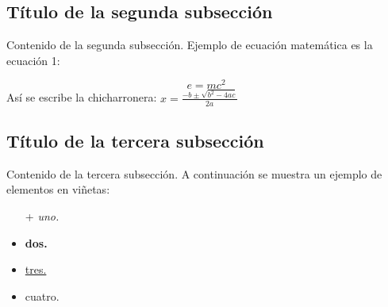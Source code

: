 \subsection{Título de la segunda subsección}
Contenido de la segunda subsección. Ejemplo de ecuación matemática es la ecuación 1:

\begin{equation}
    e=mc^2
    \label{ecuacion}
\end{equation}
Así se escribe la chicharronera: $x = \frac {-b \pm \sqrt {b^2 - 4ac}}{2a}$ 

\subsection{Título de la tercera subsección}
Contenido de la tercera subsección. A continuación se muestra un ejemplo de elementos en viñetas:

\begin{itemize} %
    \item [+]\textit{uno.}
    \item \textbf{dos.}
    \item \underline{tres.}
    \item cuatro.
\end{itemize}


